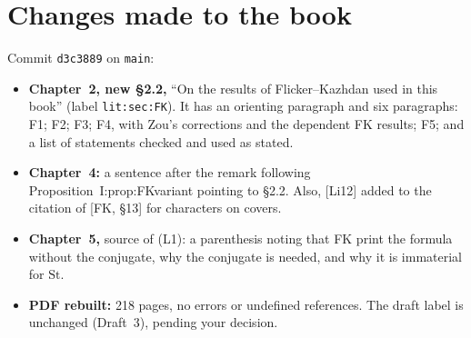 \documentclass[12pt,letterpaper]{article}
\newcommand{\St}{\mathrm{St}}\newcommand{\vol}{\operatorname{vol}}
\begin{document}
\section{Changes made to the book}\label{sec:edits}

Commit \texttt{d3c3889} on \texttt{main}:
\begin{itemize}
\item \textbf{Chapter~2, new \S2.2,} ``On the results of Flicker--Kazhdan used in this book'' (label \texttt{lit:sec:FK}). It has an orienting paragraph and six paragraphs: F1; F2; F3; F4, with Zou's corrections and the dependent FK results; F5; and a list of statements checked and used as stated.
\item \textbf{Chapter~4:} a sentence after the remark following Proposition~I:prop:FKvariant pointing to \S2.2. Also, [Li12] added to the citation of [FK, \S13] for characters on covers.
\item \textbf{Chapter~5,} source of (L1): a parenthesis noting that FK print the formula without the conjugate, why the conjugate is needed, and why it is immaterial for $\St$.
\item \textbf{PDF rebuilt:} 218 pages, no errors or undefined references. The draft label is unchanged (Draft~3), pending your decision.
\end{itemize}
\end{document}
